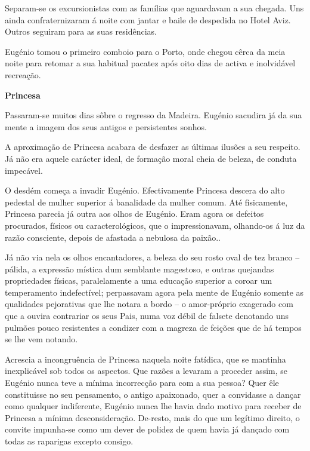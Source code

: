 \documentclass[9pt]{article}
\begin{document}
Separam-se os excursionistas com as fa\-mí\-lias que aguardavam a sua
chegada. Uns ainda confraternizaram á noite com jantar e baile de despedida no Hotel Aviz. Outros seguiram para as suas residên\-cias.

Eugé\-nio tomou o primeiro comboio para o Porto, onde chegou cêrca da
meia noite para retomar a sua habitual pacatez após oito dias de activa
e inolvidável recrea\-ção.

\begin{center}\bf\large Princesa\end{center}

Passaram-se muitos dias sôbre o regresso da Madeira. Eugé\-nio sacudira
já da sua mente a imagem dos seus antigos e persistentes sonhos.

 A aproxima\-ção de Princesa acabara de desfazer as últimas ilusões a seu respeito.
 Já não era aquele carácter ideal, de forma\-ção moral cheia de beleza, de
conduta impecável.

O desdém começa a invadir Eugé\-nio. Efectivamente Princesa descera do
alto pedestal de mu\-lher superior á banalidade da mu\-lher comum. Até fisicamente, Princesa parecia já outra aos o\-lhos de Eugé\-nio. Eram agora os defeitos
procurados, físicos ou caracterológicos, que o impressionavam, o\-lhando-os á luz
da razão consciente, depois de afastada a nebulosa da paixão..

Já não via nela os o\-lhos encantadores, a beleza do seu rosto oval de tez
branco -- pálida, a ex\-pres\-são mística dum semblante magestoso, e outras quejandas
propriedades físicas, paralelamente a uma educa\-ção superior a coroar um temperamento indefectível; perpassavam agora pela mente de Eugé\-nio somente as
qualidades pejorativas que lhe notara a bordo -- o amor-próprio exagerado com
que a ouvira contrariar os seus Pais, numa voz débil de falsete denotando uns
pulmões pouco resistentes a condizer com a magreza de fei\-ções que de há tempos se lhe vem notando.

Acrescia a incongruência de Princesa naquela noite fatídica, que se mantinha inexplicável sob todos os aspectos. Que razões a levaram a proceder assim,
se Eugé\-nio nunca teve a mínima incorrec\-ção para com a sua pessoa?
Quer êle constituisse no seu pensamento, o antigo apaixonado, quer a convidasse
a dan\-çar como qualquer indiferente, Eugé\-nio nunca lhe havia dado motivo para
receber de Princesa a mínima desconsidera\-ção. De-resto, mais do que um legítimo
direito, o convite impunha-se como um dever de polidez de quem havia já dan\-çado com todas as raparigas excepto consigo.
\end{document}
